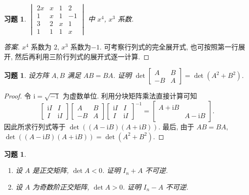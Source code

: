 \documentclass[UTF8]{ctexart}
\newtheorem{ex}[thm]{习题}
\begin{document}
\begin{ex}
  \(\begin{vmatrix} 2x & x & 1 & 2 \\ 1 & x & 1 & -1\\ 3 & 2 & x & 1 \\ 1 & 1 & 1& x\end{vmatrix}\)
  中 \(x^4\), \(x^3\) 系数.
\end{ex}

\begin{proof}[答案]
  \(x^4\) 系数为 \(2\), \(x^3\) 系数为$ -1$. 可考察行列式的完全展开式,
  也可按照第一行展开, 然后再利用三阶行列式的展开式逐一计算.
\end{proof}

\begin{ex}
  设方阵 \(A,B\) 满足 \(AB=BA\). 证明
  \(\det\begin{bmatrix}A & B\\-B & A\end{bmatrix}=\det(A^2+B^2)\).
\end{ex}

\begin{proof}
  令 \(\mathrm{i}=\sqrt{-1}\) 为虚数单位.
  利用分块矩阵乘法直接计算可知
  \begin{equation*}
    \begin{bmatrix}
      \mathrm{i}I & I \\ I & \mathrm{i}I
    \end{bmatrix}
    \begin{bmatrix}
      A & B \\ -B & A
    \end{bmatrix}
    \begin{bmatrix}
      \mathrm{i}I & I \\ I & \mathrm{i}I
    \end{bmatrix}^{-1} =
    \begin{bmatrix}
      A+\mathrm{i}B & \\ & A-\mathrm{i}B
    \end{bmatrix}.
  \end{equation*}
  因此所求行列式等于 \(\det((A-\mathrm{i}B)(A+\mathrm{i}B))\).
  最后, 由于 \(AB=BA\),
  \(\det((A-\mathrm{i}B)(A+\mathrm{i}B))=\det(A^2+B^2)\).
\end{proof}

\begin{ex}
  \begin{enumerate}
  \item
    设 \(A\) 是正交矩阵, \(\det A < 0\). 证明 \(I_n + A\) 不可逆.
  \item   设 \(A\) 为奇数阶正交矩阵, \(\det A > 0\).
    证明 \(I_n - A\) 不可逆.
  \end{enumerate}
\end{ex}
\end{document}
